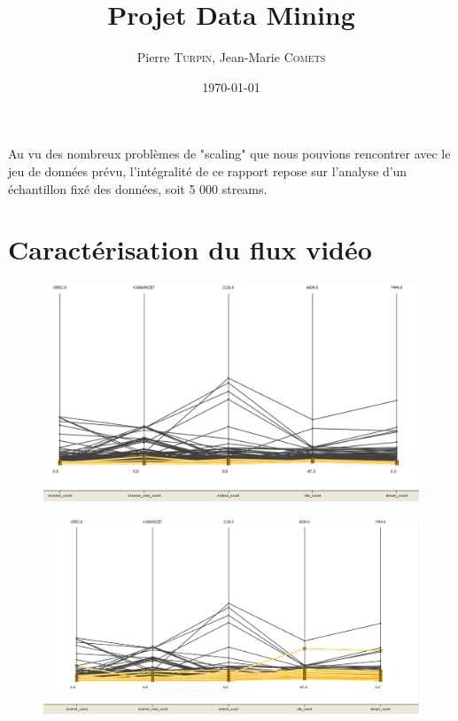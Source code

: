 \documentclass[11pt, a4paper, titlepage]{scrartcl}
\title{Projet Data Mining}
\author{Pierre \textsc{Turpin}, Jean-Marie \textsc{Comets}}
\date{\today}
\begin{document}
\maketitle
\tableofcontents
\newpage

Au vu des nombreux problèmes de "scaling" que nous pouvions rencontrer
avec le jeu de données prévu, l'intégralité de ce rapport repose sur
l'analyse d'un échantillon fixé des données, soit 5 000 streams.

\section{Caractérisation du flux vidéo}

\begin{figure}[h]
    \centering
    \includegraphics[width=\textwidth]{images/embed_enabled_influence}
    \caption{}
\end{figure}

\begin{figure}[h]
    \centering
    \includegraphics[width=\textwidth]{images/featured_influence}
    \caption{}
\end{figure}
\end{document}
